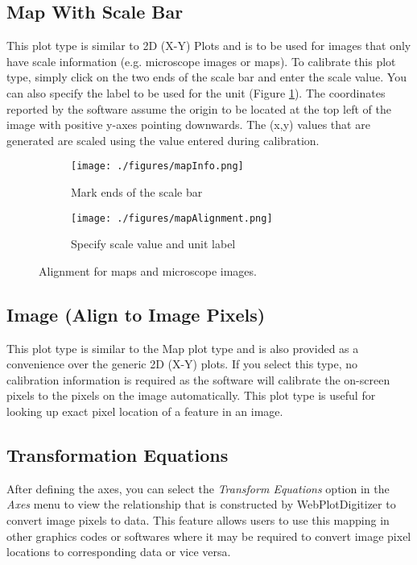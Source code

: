 \documentclass[letterpaper, 10pt]{article}
\begin{document}
\subsection{Map With Scale Bar}
This plot type is similar to 2D (X-Y) Plots and is to be used for images that only have scale information (e.g. microscope images or maps). To calibrate this plot type, simply click on the two ends of the scale bar and enter the scale value. You can also specify the label to be used for the unit (Figure \ref{fig:mapAlignment}). The coordinates reported by the software assume the origin to be located at the top left of the image with positive y-axes pointing downwards. The (x,y) values that are generated are scaled using the value entered during calibration.

\begin{figure}
\centering
{\begin{subfigure}[b]{0.3\textwidth}
\texttt{[image: ./figures/mapInfo.png]}
\caption{Mark ends of the scale bar}
\end{subfigure}
\begin{subfigure}[b]{0.3\textwidth}
\texttt{[image: ./figures/mapAlignment.png]}
\caption{Specify scale value and unit label}
\end{subfigure}}
\caption{Alignment for maps and microscope images.}
\label{fig:mapAlignment}
\end{figure}

\subsection{Image (Align to Image Pixels)}
This plot type is similar to the Map plot type and is also provided as a convenience over the generic 2D (X-Y) plots. If you select this type, no calibration information is required as the software will calibrate the on-screen pixels to the pixels on the image automatically. This plot type is useful for looking up exact pixel location of a feature in an image.

\subsection{Transformation Equations}
After defining the axes, you can select the \emph{Transform Equations} option in the \emph{Axes} menu to view the relationship that is constructed by WebPlotDigitizer to convert image pixels to data. This feature allows users to use this mapping in other graphics codes or softwares where it may be required to convert image pixel locations to corresponding data or vice versa.
\end{document}
